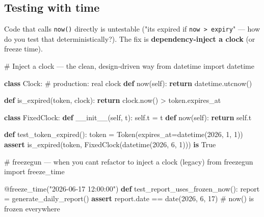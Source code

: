 \documentclass[11pt]{article}
\newenvironment{Shaded}{\begin{snugshade}}{\end{snugshade}}
\newcommand{\AttributeTok}[1]{\textcolor[rgb]{0.16,0.50,0.73}{#1}}
\newcommand{\CommentTok}[1]{\textcolor[rgb]{0.48,0.49,0.49}{#1}}
\newcommand{\ControlFlowTok}[1]{\textcolor[rgb]{0.99,0.74,0.29}{\textbf{#1}}}
\newcommand{\DecValTok}[1]{\textcolor[rgb]{0.96,0.45,0.00}{#1}}
\newcommand{\FunctionTok}[1]{\textcolor[rgb]{0.56,0.27,0.68}{#1}}
\newcommand{\ImportTok}[1]{\textcolor[rgb]{0.15,0.68,0.38}{#1}}
\newcommand{\KeywordTok}[1]{\textcolor[rgb]{0.81,0.81,0.76}{\textbf{#1}}}
\newcommand{\NormalTok}[1]{\textcolor[rgb]{0.81,0.81,0.76}{#1}}
\newcommand{\OperatorTok}[1]{\textcolor[rgb]{0.81,0.81,0.76}{#1}}
\newcommand{\StringTok}[1]{\textcolor[rgb]{0.96,0.31,0.31}{#1}}
\newcommand{\VariableTok}[1]{\textcolor[rgb]{0.15,0.68,0.68}{#1}}
\begin{document}
\subsection{Testing with time}\label{testing-with-time}

Code that calls \texttt{now()} directly is untestable ("it\textquotesingle s expired if \texttt{now\ \textgreater{}\ expiry}" --- how do you test that deterministically?). The fix is \textbf{dependency-inject a clock} (or freeze time).


\begin{Shaded}
\begin{Highlighting}[]
\CommentTok{\# Inject a clock — the clean, design{-}driven way}
\ImportTok{from}\NormalTok{ datetime }\ImportTok{import}\NormalTok{ datetime}

\KeywordTok{class}\NormalTok{ Clock:                      }\CommentTok{\# production: real clock}
    \KeywordTok{def}\NormalTok{ now(}\VariableTok{self}\NormalTok{): }\ControlFlowTok{return}\NormalTok{ datetime.utcnow()}

\KeywordTok{def}\NormalTok{ is\_expired(token, clock):}
    \ControlFlowTok{return}\NormalTok{ clock.now() }\OperatorTok{\textgreater{}}\NormalTok{ token.expires\_at}

\KeywordTok{class}\NormalTok{ FixedClock:}
    \KeywordTok{def} \FunctionTok{\_\_init\_\_}\NormalTok{(}\VariableTok{self}\NormalTok{, t): }\VariableTok{self}\NormalTok{.t }\OperatorTok{=}\NormalTok{ t}
    \KeywordTok{def}\NormalTok{ now(}\VariableTok{self}\NormalTok{): }\ControlFlowTok{return} \VariableTok{self}\NormalTok{.t}

\KeywordTok{def}\NormalTok{ test\_token\_expired():}
\NormalTok{    token }\OperatorTok{=}\NormalTok{ Token(expires\_at}\OperatorTok{=}\NormalTok{datetime(}\DecValTok{2026}\NormalTok{, }\DecValTok{1}\NormalTok{, }\DecValTok{1}\NormalTok{))}
    \ControlFlowTok{assert}\NormalTok{ is\_expired(token, FixedClock(datetime(}\DecValTok{2026}\NormalTok{, }\DecValTok{6}\NormalTok{, }\DecValTok{1}\NormalTok{))) }\KeywordTok{is} \VariableTok{True}
\end{Highlighting}
\end{Shaded}


\begin{Shaded}
\begin{Highlighting}[]
\CommentTok{\# freezegun — when you can\textquotesingle{}t refactor to inject a clock (legacy)}
\ImportTok{from}\NormalTok{ freezegun }\ImportTok{import}\NormalTok{ freeze\_time}

\AttributeTok{@freeze\_time}\NormalTok{(}\StringTok{"2026{-}06{-}17 12:00:00"}\NormalTok{)}
\KeywordTok{def}\NormalTok{ test\_report\_uses\_frozen\_now():}
\NormalTok{    report }\OperatorTok{=}\NormalTok{ generate\_daily\_report()}
    \ControlFlowTok{assert}\NormalTok{ report.date }\OperatorTok{==}\NormalTok{ date(}\DecValTok{2026}\NormalTok{, }\DecValTok{6}\NormalTok{, }\DecValTok{17}\NormalTok{)   }\CommentTok{\# now() is frozen everywhere}
\end{Highlighting}
\end{Shaded}
\end{document}
